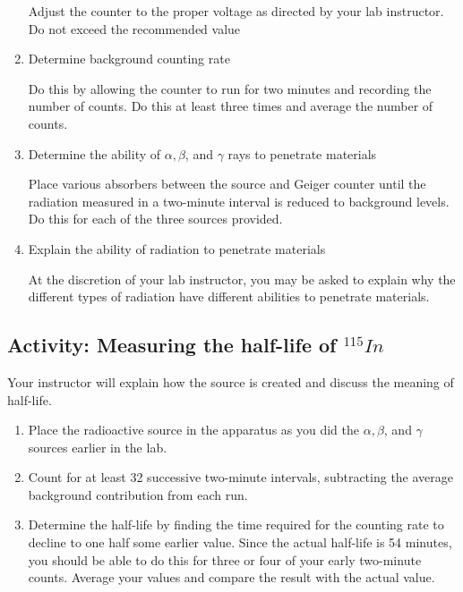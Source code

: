 \begin{multicols}{2}
\begin{enumerate}
Adjust the counter to the proper voltage as directed by your lab instructor. Do not exceed the recommended value

	\item Determine background counting rate
	
Do this by allowing the counter to run for two minutes and recording the number of counts. Do this at least three times and average the number of counts.

	\item Determine the ability of  $\alpha, \beta$, and $\gamma $ rays to penetrate materials

Place various absorbers between the source and Geiger counter until the radiation measured in a two-minute interval is reduced to background levels. Do this for each of the three sources provided.

	\item Explain the ability of radiation to penetrate materials

At the discretion of your lab instructor, you may be asked to explain why the different types of radiation have different abilities to penetrate materials.

\end{enumerate}


\subsection{Activity: Measuring the half-life of $^{115}In$}
Your instructor will explain how the source is created and discuss the meaning of half-life.
\begin{enumerate}
	\item Place the radioactive source in the apparatus as you did the $\alpha, \beta$, and $\gamma$ sources earlier in the lab.

	\item Count for at least 32 successive two-minute intervals, subtracting the average background contribution from each run.

	\item Determine the half-life by finding the time required for the counting rate to decline to one half some earlier value. Since the actual half-life is 54 minutes, you should be able to do this for three or four of your early two-minute counts. Average your values and compare the result with the actual value.
\end{enumerate}
\end{multicols}

